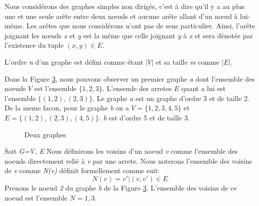 \documentclass[12pt,a4paper]{article}
\begin{document}
Nous considérons des graphes simples non dirigés, c'est à dire qu'il y a au plus une et une seule arête entre deux nœuds et aucune arête allant d'un nœud à lui-même. Les arêtes que nous considérons n'ont pas de sens particulier. Ainsi, l'arête joignant les nœuds \emph{x} et \emph{y} est la même que celle joignant \emph{y} à \emph{x} et sera dénotée par l'existence du tuple $(x, y) \in E$.

L'ordre \emph{n} d'un graphe est défini comme étant $ |V| $ et sa taille \emph{m} comme $ |E| $.

Dans la Figure \ref{fig:x exemple1}, nous pouvons observer un premier graphe \textit{a} dont l'ensemble des noeuds \(V\) est l'ensemble \(\{1, 2, 3\}\). L'ensemle des arretes \(E\) quant a lui est l'ensemble \(\{(1,2), (2,3)\}\). Le graphe \textit{a} est un graphe d'ordre 3 et de taille 2. De la meme facon, pour le graphe \textit{b} on a \(V = \{1, 2, 3, 4, 5\}\) et \(E = \{(1,2), (2,3), (4,5)\}\). \textit{b} est d'ordre 5 et de taille 3.

\begin{figure}[h]
  \begin{subfigure}[b]{0.50\textwidth}
    \centering
        \caption{}
        \label{fig:x g1}
  \end{subfigure}
  \begin{subfigure}[b]{0.50\textwidth}
    \centering
        \caption{}
        \label{fig:x g2}
  \end{subfigure}
  \caption{Deux graphes}
  \label{fig:x exemple1}
\end{figure}

Soit \emph{G=V, E} Nous définirons les voisins d'un noeud \emph{v} comme l'ensemble des noeuds directement relié à \emph{v} par une arrete. Nous noterons l'ensemble des voisins de \emph{v} comme \emph{N(v)} définit formellement comme suit:
\begin{equation}
N(v) = { v' | (v, v') \in E }
\end{equation}
Prenons le noeud \emph{2} du graphe \emph{b} de la Figure \ref{fig:x exemple1}. L'ensemble des voisins de ce noeud est l'ensemble \(N = {1, 3}\).
\end{document}
